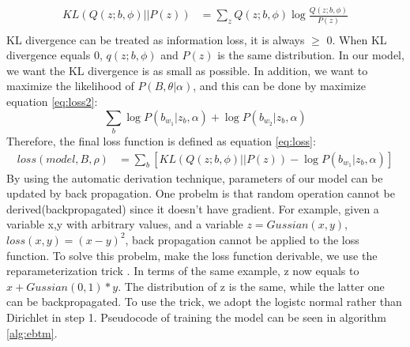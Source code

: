 \begin{equation}
    \begin{aligned}
        KL(Q(z;b,\phi)||P(z)) & = \sum_zQ(z;b,\phi)\log\frac{Q(z;b,\phi)}{P(z)}\\
    \end{aligned} 
    \label{eq:KL}
\end{equation}
KL divergence can be treated as information loss, it is always $\geq$ 0. When KL divergence equals 0, $q(z;b,\phi)$ and $P(z)$ is the same distribution. In our model, we want the KL divergence is as small as possible. In addition, we want to maximize the likelihood of $P(B,\theta|\alpha)$, and this can be done by maximize equation \ref{eq:loss2}:
\begin{equation}
    \sum_b\log P(b_{w_1}|z_b,\alpha)+\log P(b_{w_2}|z_b,\alpha)
    \label{eq:loss2}
\end{equation}
Therefore, the final loss function is defined as equation \ref{eq:loss}:
\begin{equation}
    \begin{aligned}
        loss(model, B, \rho) & = \sum_b\left[KL(Q(z;b,\phi)||P(z))-\log P(b_{w_1}|z_b,\alpha)\right] 
    \end{aligned}    
    \label{eq:loss}
\end{equation}
By using the automatic derivation technique, parameters of our model can be updated by back propagation. One probelm is that random operation cannot be derived(backpropagated) since it doesn't have gradient. For example, given a variable x,y with arbitrary values, and a variable $z = Gussian(x,y)$, $loss(x,y) = (x-y)^2$, back propagation cannot be applied to the loss function. To solve this probelm, make the loss function derivable, we use the reparameterization trick \cite{kingma2013auto}. In terms of the same example, z now equals to $x + Gussian(0,1) * y$. The distribution of z is the same, while the latter one can be backpropagated. To use the trick, we adopt the logistc normal rather than Dirichlet in step 1. Pseudocode of training the model can be seen in algorithm \ref{alg:ebtm}.
